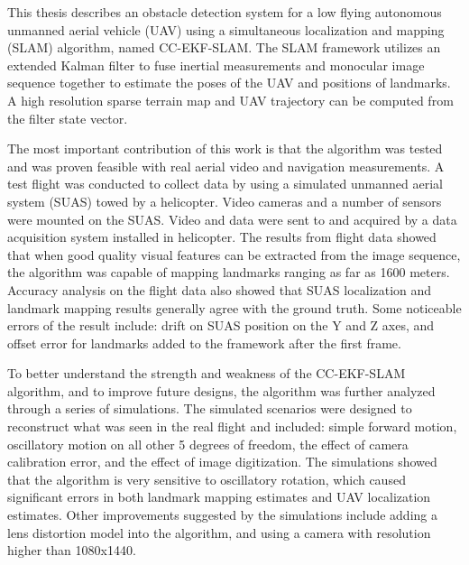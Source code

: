 
This thesis describes an obstacle detection system for a low flying
autonomous unmanned aerial vehicle (UAV) using a simultaneous
localization and mapping (SLAM) algorithm, named CC-EKF-SLAM.
The SLAM framework utilizes an extended Kalman filter to fuse inertial
measurements and monocular image sequence together to estimate the
poses of the UAV and positions of landmarks. A high resolution sparse
terrain map and UAV trajectory can be computed from the filter state
vector. 

The most important contribution of this work is
that the algorithm was tested and was proven feasible with real aerial
video and navigation measurements. A test flight was conducted to
collect data by using a simulated unmanned aerial system (SUAS) towed
by a helicopter. Video cameras and a number of sensors were mounted on
the SUAS. Video and data were sent to and acquired by a data
acquisition system installed in helicopter. The results from flight
data showed that when good quality visual features can be extracted
from the image sequence, the algorithm was capable of mapping
landmarks ranging as far as 1600 meters. Accuracy analysis on the
flight data also showed that SUAS localization and landmark mapping
results generally agree with the ground truth. Some noticeable errors
of the result include: drift on SUAS position on the Y and Z axes, and
offset error for landmarks added to the framework after the first
frame.

To better understand the strength and weakness of
the CC-EKF-SLAM algorithm, and to improve future designs, the
algorithm was further analyzed through a series of simulations. The
simulated scenarios were designed to reconstruct what was seen in the
real flight and included: simple forward motion, oscillatory motion on
all other 5 degrees of freedom, the effect of camera calibration
error, and the effect of image digitization. The simulations showed
that the algorithm is very sensitive to oscillatory rotation, which
caused significant errors in both landmark mapping estimates and UAV
localization estimates. Other improvements suggested by the
simulations include adding a lens distortion model into the algorithm,
and using a camera with resolution higher than 1080x1440.
